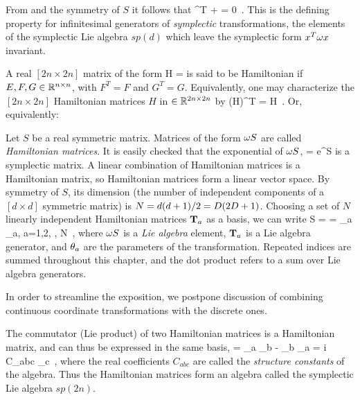 From
 and
the symmetry of $S$
it follows that
\beq
 \Lg^T {\bf \omega} + {\bf \omega} \Lg = 0
\,.
This is the defining property for
infinitesimal generators of {\em symplectic}
transformations, the elements of the symplectic
Lie algebra $sp(d)$
which leave
the symplectic form $x^T {\bf \omega} x$ invariant.

A real $[\!2n\times\!2n]$ matrix of the form
\beq
H = 
is said to be Hamiltonian if $E, F, G \in \mathbb{R}^{n \times n}$,
 with $F^T = F$ and $G^T = G$. Equivalently, one
may characterize the $[\!2n\times\!2n]$  Hamiltonian matrices $H$
in $\in \mathbb{R}^{2n \times 2n}$ by
\beq
({\bf \omega}H)^T = {\bf \omega}H
\,.
Or, equivalently:

Let $S$ be a real symmetric matrix. Matrices of the form ${\bf \omega}S$ are
called \emph{Hamiltonian matrices}. It is easily checked that
the exponential of
${\bf \omega}S$,
\beq
\LieEl = e^{{\bf \omega}S}
is a symplectic matrix.
A linear combination  of
Hamiltonian matrices is a Hamiltonian matrix, so
Hamiltonian matrices form a linear vector space. By symmetry of
$S$, its dimension (the number of independent components of a
$[\!d\times\! d]$ symmetric matrix) is
$N= d(d+1)/2 = D(2D+1)$. Choosing a set of $N$ linearly
independent Hamiltonian matrices $\mathbf{T}_a$ as a basis, we
can write
\beq
{\bf \omega}S
 = \gSpace \cdot \Lg  = \sum \gSpace_a \Lg_a,\; a=1,2, \cdots, N
\,,
where ${\bf \omega}S$
is a {\em Lie algebra} element,  $\mathbf{T}_a$ is a Lie algebra generator,
and $\theta_a$ are the parameters
of the transformation. Repeated indices are summed throughout this
chapter, and the dot product refers to a sum over
Lie algebra generators.

In order to streamline the exposition, we
postpone discussion of combining continuous coordinate
transformations with the discrete ones.

The commutator (Lie product) of two Hamiltonian matrices is a Hamiltonian
matrix, and can thus be expressed in the same basis,
\beq
[\Lg_a, \Lg_b]
	=
\Lg_a \Lg_b - \Lg_b \Lg_a
	=
i C_{abc} \Lg_c
\,,
where the real coefficients $C_{abc}$ are called the \emph{structure
constants} of the algebra. Thus the Hamiltonian matrices form an algebra
called the symplectic Lie algebra $sp(2n)$.

